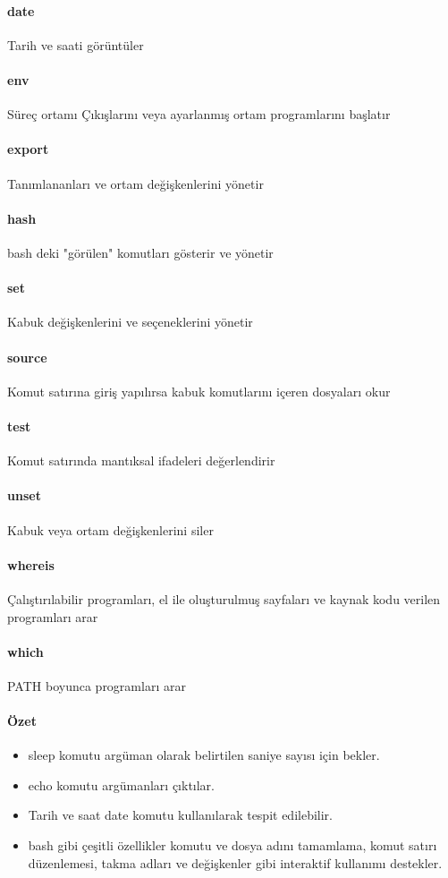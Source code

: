 \paragraph{date}{Tarih ve saati görüntüler}
\paragraph{env}{Süreç ortamı Çıkışlarını veya ayarlanmış ortam programlarını başlatır}
\paragraph{export}{Tanımlananları ve ortam değişkenlerini yönetir}
\paragraph{hash}{bash deki "görülen" komutları gösterir ve yönetir}
\paragraph{set}{Kabuk değişkenlerini ve seçeneklerini yönetir}
\paragraph{source}{Komut satırına giriş yapılırsa kabuk komutlarını içeren dosyaları okur}
\paragraph{test}{Komut satırında mantıksal ifadeleri değerlendirir}
\paragraph{unset}{Kabuk veya ortam değişkenlerini siler}
\paragraph{whereis}{Çalıştırılabilir programları, el ile oluşturulmuş sayfaları ve kaynak kodu verilen programları arar}
\paragraph{which}{PATH boyunca programları arar}

\paragraph{Özet}{
\begin{itemize}
\item sleep komutu argüman olarak belirtilen saniye sayısı için bekler.
\item echo komutu argümanları çıktılar.
\item Tarih ve saat date komutu kullanılarak tespit edilebilir.
\item bash gibi çeşitli özellikler komutu ve dosya adını tamamlama, komut satırı düzenlemesi, takma adları ve değişkenler gibi interaktif kullanımı destekler.
\end{itemize}
}